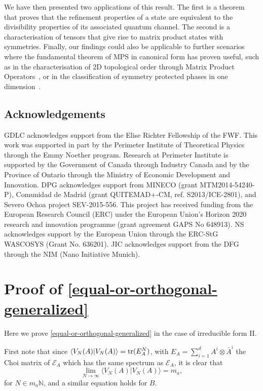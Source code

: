 \documentclass[pra,a4paper,notitlepage,nofootinbib,superscriptaddress]{revtex4-1}
\theoremstyle{plain}
\newcommand{\1}{{\openone}}
\newcommand{\ra}{\rangle}
\newcommand{\la}{\langle}
\begin{document}
We have then presented two applications of this result. The first is a theorem
that proves that the refinement properties of a state are equivalent to
the divisibility properties of its associated quantum channel.  The second
is a characterisation of tensors that give rise to matrix product states
with symmetries.  Finally, our findings could also be applicable to further
scenarios where the fundamental theorem of MPS in canonical form has
proven useful, such as in the characterisation of 2D topological order
through Matrix Product Operators~\cite{Bu17}, or in the classification of
symmetry protected phases in one dimension~\cite{Ch11,Sc11}.


\subsection*{Acknowledgements}
GDLC acknowledges support from the Elise Richter Fellowship of the FWF.
This work was supported in part by the Perimeter Institute of Theoretical Physics through the Emmy Noether program. Research at Perimeter Institute is supported by the Government of Canada through Industry Canada and by the Province of Ontario through the Ministry of Economic Development and Innovation.
DPG acknowledges support from  MINECO (grant MTM2014-54240-P), Comunidad de Madrid (grant QUITEMAD+-CM, ref. S2013/ICE-2801), and Severo Ochoa project SEV-2015-556.
This project has received funding from the European Research Council (ERC) under the European Union's Horizon 2020 research and innovation programme (grant agreement GAPS No 648913).
NS acknowledges support by the European Union through the ERC-StG WASCOSYS (Grant No. 636201).
JIC acknowledges
support from the DFG through the NIM (Nano Initiative Munich).




\appendix



\section{Proof of  \cref{equal-or-orthogonal-generalized}}
\label{app}

Here we  prove \cref{equal-or-orthogonal-generalized} in the case of irreducible form II.

First note that since $\la V_N(A)|V_N(A)\ra={\rm tr}(E_A^N)$, with
$E_A=\sum_{i=1}^d A^i\otimes \bar A^i$ the Choi matrix of $\mathcal E_A$
which has the same spectrum as $\mathcal E_A$, it is clear that $$
    \lim_{N\to \infty}\la V_N(A) |V_N(A)\ra =m_a,
$$
for $N \in m_a \mathbb{N}$,
and a similar equation holds for $B$.
\end{document}
